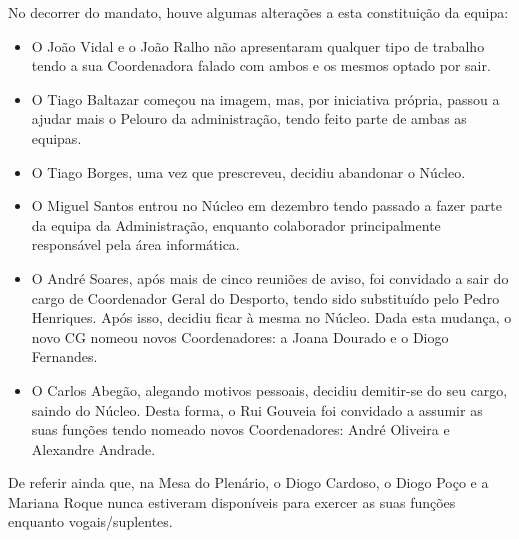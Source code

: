 No decorrer do mandato, houve algumas alterações a esta constituição da equipa:
\begin{itemize}
\item O João Vidal e o João Ralho não apresentaram qualquer tipo de trabalho tendo a sua Coordenadora falado com ambos e os mesmos optado por sair.
\item O Tiago Baltazar começou na imagem, mas, por iniciativa própria, passou a ajudar mais o Pelouro da administração, tendo feito parte de ambas as equipas.
\item O Tiago Borges, uma vez que prescreveu, decidiu abandonar o Núcleo.
\item O Miguel Santos entrou no Núcleo em dezembro tendo passado a fazer parte da equipa da Administração, enquanto colaborador principalmente responsável pela área informática.
\item O André Soares, após mais de cinco reuniões de aviso, foi convidado a sair do cargo de Coordenador Geral do Desporto, tendo sido substituído pelo Pedro Henriques. Após isso, decidiu ficar à mesma no Núcleo. Dada esta mudança, o novo CG nomeou novos Coordenadores: a Joana Dourado e o Diogo Fernandes.
\item O Carlos Abegão, alegando motivos pessoais, decidiu demitir-se do seu cargo, saindo do Núcleo. Desta forma, o Rui Gouveia foi convidado a assumir as suas funções tendo nomeado novos Coordenadores: André Oliveira e Alexandre Andrade.
\end{itemize}

De referir ainda que, na Mesa do Plenário, o Diogo Cardoso, o Diogo Poço e a Mariana Roque nunca estiveram disponíveis para exercer as suas funções enquanto vogais/suplentes. 
